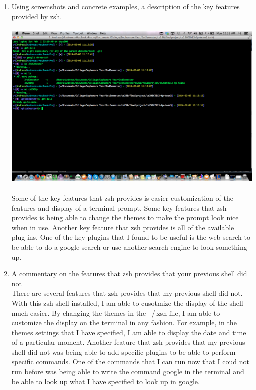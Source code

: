 \documentclass{article}
\begin{document}
\newpage
\begin{enumerate}
\item Using screenshots and concrete examples, a description of the key features provided by zsh.
\\
\\
\includegraphics[width=5in]{images/prompt2.png}
\\
\\
Some of the key features that zsh provides is easier customization of the features and display of a terminal prompt. Some key features that zsh provides is being able to change the themes to make the prompt look nice when in use. Another key feature that zsh provides is all of the available plug-ins. One of the key plugins that I found to be useful is the web-search to be able to do a google search or use another search engine to look something up.
\\
\item A commentary on the features that zsh provides that your previous shell did not
\\
There are several features that zsh provides that my previous shell did not. With this zsh shell installed, I am able to cusotmize the display of the shell much easier. By changing the themes in the ~/.zsh file, I am able to customize the display on the terminal in any fashion. For example, in the themes settings that I have specified, I am able to display the date and time of a particular moment. Another feature that zsh provides that my previous shell did not was being able to add specific plugins to be able to perform specific commands. One of the commands that I can run now that I coud not run before was being able to write the command google in the terminal and be able to look up what I have specified to look up in google.
\\

\end{enumerate}
\end{document}
